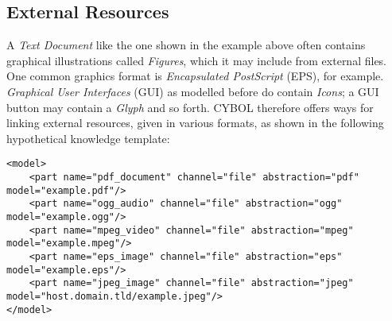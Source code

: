 %
%
%
%
%
%

\subsection{External Resources}
\label{external_resources_heading}

A \emph{Text Document} like the one shown in the example above often contains
graphical illustrations called \emph{Figures}, which it may include from
external files. One common graphics format is \emph{Encapsulated PostScript}
(EPS), for example. \emph{Graphical User Interfaces} (GUI) as modelled before
do contain \emph{Icons}; a GUI button may contain a \emph{Glyph} and so forth.
CYBOL therefore offers ways for linking external resources, given in various
formats, as shown in the following hypothetical knowledge template:

\begin{scriptsize}
    \begin{verbatim}
<model>
    <part name="pdf_document" channel="file" abstraction="pdf" model="example.pdf"/>
    <part name="ogg_audio" channel="file" abstraction="ogg" model="example.ogg"/>
    <part name="mpeg_video" channel="file" abstraction="mpeg" model="example.mpeg"/>
    <part name="eps_image" channel="file" abstraction="eps" model="example.eps"/>
    <part name="jpeg_image" channel="file" abstraction="jpeg" model="host.domain.tld/example.jpeg"/>
</model>
    \end{verbatim}
\end{scriptsize}
